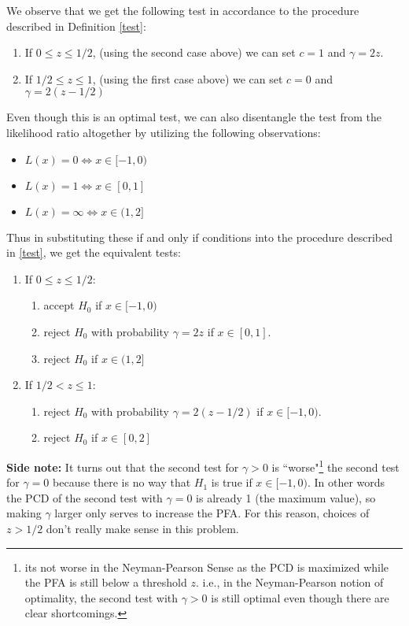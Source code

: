 \documentclass{article}
\begin{document}
\begin{example}
We observe that we get the following test in accordance to the procedure described in Definition \ref{test}:
\begin{enumerate}
    \item If $0 \leq z \leq 1/2$, (using the second case above) we can set $c = 1$ and $\gamma = 2z$.
    \item If $1/2 \leq z \leq 1$, (using the first case above) we can set $c = 0$ and $\gamma = 2(z- 1/2)$
\end{enumerate}

Even though this is an optimal test, we can also disentangle the test from the likelihood ratio altogether by utilizing the following observations:
\begin{itemize}
    \item $L(x) = 0 \iff x \in [-1, 0)$
    \item $L(x) = 1 \iff x \in [0, 1]$
    \item $L(x) = \infty \iff x \in (1, 2]$
\end{itemize}

Thus in substituting these if and only if conditions into the procedure described in \ref{test}, we get the equivalent tests:
\begin{enumerate}
    \item If $0 \leq z \leq 1/2$:
    \begin{enumerate}
        \item accept $H_0$ if $x \in [-1, 0)$
        \item reject $H_0$ with probability $\gamma = 2z$ if $x \in [0, 1]$.
        \item reject $H_0$ if $x \in (1, 2]$
\end{enumerate}
    \item If $1/2 < z \leq 1$:
    \begin{enumerate}
        \item reject $H_0$ with probability $\gamma = 2(z-  1/2)$ if $x \in [-1, 0)$.
        \item reject $H_0$ if $x \in [0, 2]$
\end{enumerate}
\end{enumerate}

\textbf{Side note:} It turns out that the second test for $\gamma > 0$ is ``worse"\footnote{its not worse in the Neyman-Pearson Sense as the PCD is maximized while the PFA is still below a threshold $z$. i.e., in the Neyman-Pearson notion of optimality, the second test with $\gamma > 0$ is still optimal even though there are clear shortcomings.} the second test for $\gamma = 0$ because there is no way that $H_1$ is true if $x \in [-1, 0)$. In other words the PCD of the second test with $\gamma=0$ is already 1 (the maximum value), so making $\gamma$ larger only serves to increase the PFA. For this reason, choices of $z>1/2$ don't really make sense in this problem.
\end{example}
\end{document}
